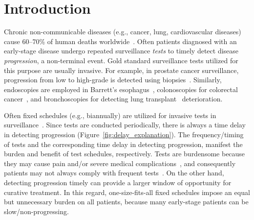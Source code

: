 \section{Introduction}
\label{sec:introduction}
Chronic non-communicable diseases (e.g., cancer, lung, cardiovascular diseases) cause 60--70\% of human deaths worldwide~\citep{world2014global}. Often patients diagnosed with an early-stage disease undergo repeated surveillance \textit{tests} to timely detect disease \textit{progression}, a non-terminal event. Gold standard surveillance tests utilized for this purpose are usually invasive. For example, in prostate cancer surveillance, progression from low to high-grade is detected using biopsies~\citep{bokhorst2015compliance}. Similarly, endoscopies are employed in Barrett's esophagus~\citep{streitz1993endoscopic}, colonoscopies for colorectal cancer~\citep{krist2007timing}, and bronchoscopies for detecting lung transplant~\citep{mcwilliams2008surveillance} deterioration.

Often fixed schedules (e.g., biannually) are utilized for invasive tests in surveillance~\citep{mcwilliams2008surveillance,bokhorst2015compliance,krist2007timing}. Since tests are conducted periodically, there is always a time delay in detecting progression (Figure~\ref{fig:delay_explanation}). The frequency/timing of tests and the corresponding time delay in detecting progression, manifest the burden and benefit of test schedules, respectively. Tests are burdensome because they may cause pain and/or severe medical complications~\citep{loeb2013systematic,krist2007timing}, and consequently patients may not always comply with frequent tests~\citep{bokhorst2015compliance}. On the other hand, detecting progression timely can provide a larger window of opportunity for curative treatment. In this regard, one-size-fits-all fixed schedules impose an equal but unnecessary burden on all patients, because many early-stage patients can be slow/non-progressing.

